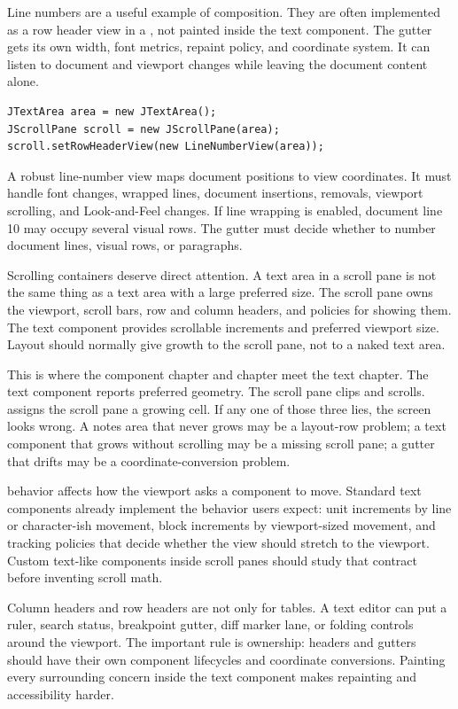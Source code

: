 Line numbers are a useful example of composition. They are often implemented as a row header view in a , not painted inside the text component. The gutter gets its own width, font metrics, repaint policy, and coordinate system. It can listen to document and viewport changes while leaving the document content alone.

\begin{lstlisting}[caption={Installing a line-number component as row header.}]
JTextArea area = new JTextArea();
JScrollPane scroll = new JScrollPane(area);
scroll.setRowHeaderView(new LineNumberView(area));
\end{lstlisting}

A robust line-number view maps document positions to view coordinates. It must handle font changes, wrapped lines, document insertions, removals, viewport scrolling, and Look-and-Feel changes. If line wrapping is enabled, document line 10 may occupy several visual rows. The gutter must decide whether to number document lines, visual rows, or paragraphs.

Scrolling containers deserve direct attention. A text area in a scroll pane is not the same thing as a text area with a large preferred size. The scroll pane owns the viewport, scroll bars, row and column headers, and policies for showing them. The text component provides scrollable increments and preferred viewport size. Layout should normally give growth to the scroll pane, not to a naked text area.

This is where the component chapter and \miglayout{} chapter meet the text chapter. The text component reports preferred geometry. The scroll pane clips and scrolls. \miglayout{} assigns the scroll pane a growing cell. If any one of those three lies, the screen looks wrong. A notes area that never grows may be a layout-row problem; a text component that grows without scrolling may be a missing scroll pane; a gutter that drifts may be a coordinate-conversion problem.

 behavior affects how the viewport asks a component to move. Standard text components already implement the behavior users expect: unit increments by line or character-ish movement, block increments by viewport-sized movement, and tracking policies that decide whether the view should stretch to the viewport. Custom text-like components inside scroll panes should study that contract before inventing scroll math.

Column headers and row headers are not only for tables. A text editor can put a ruler, search status, breakpoint gutter, diff marker lane, or folding controls around the viewport. The important rule is ownership: headers and gutters should have their own component lifecycles and coordinate conversions. Painting every surrounding concern inside the text component makes repainting and accessibility harder.


